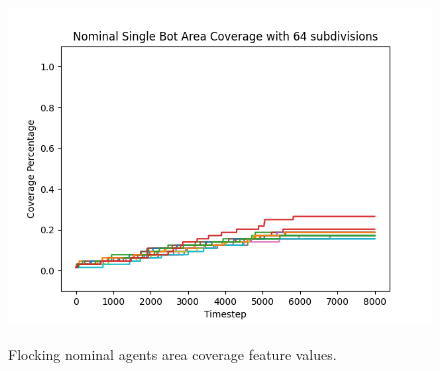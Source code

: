 \documentclass[../../Thesis.tex]{subfiles}
\begin{document}
\begin{figure}[H]
{						\includegraphics[scale=0.22]{../../Images/Experiments/flocking_15_East_6_percent_rotating_fault_after_1500_gain_1000/Nominal_Single_Bot_Area_Coverage_with_64_subdivisions.png}
					}
					\thinspace
					\caption{Flocking nominal agents area coverage feature values.}
					\label{fig:flocking_nominal_agents_area_coverage}
				\end{figure}
			
\end{document}
